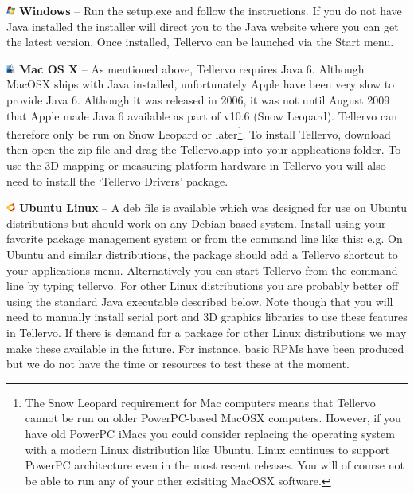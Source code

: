 \begin{description}
\item \includegraphics[width=3mm]{Images/windows.png} \textbf{Windows} -- Run the setup.exe and follow the instructions. If you do not have Java installed the installer will direct you to the Java website where you can get the latest version. Once installed, Tellervo can be launched via the Start menu.

\item \includegraphics[width=3mm]{Images/mac.png} \textbf{Mac OS X} -- As mentioned above, Tellervo requires Java 6. Although MacOSX ships with Java installed, unfortunately Apple have been very slow to provide Java 6. Although it was released in 2006, it was not until August 2009 that Apple made Java 6 available as part of v10.6 (Snow Leopard). Tellervo can therefore only be run on Snow Leopard or later\footnote{The Snow Leopard requirement for Mac computers means that Tellervo cannot be run on older PowerPC-based MacOSX computers.  However, if you have old PowerPC iMacs you could consider replacing the operating system with a modern Linux distribution like Ubuntu.  Linux continues to support PowerPC architecture even in the most recent releases.  You will of course not be able to run any of your other exisiting MacOSX software.}. To install Tellervo, download then open the zip file and drag the Tellervo.app into your applications folder.  To use the 3D mapping or measuring platform hardware in Tellervo you will also need to install the `Tellervo Drivers' package.  

\item \includegraphics[width=3mm]{Images/ubuntu.png} \textbf{Ubuntu Linux} --  A deb file is available which was designed for use on Ubuntu distributions but should work on any Debian based system. Install using your favorite package management system or from the command line like this: e.g.  On Ubuntu and similar distributions, the package should add a Tellervo shortcut to your applications menu. Alternatively you can start Tellervo from the command line by typing tellervo.  For other Linux distributions you are probably better off using the standard Java executable described below.  Note though that you will need to manually install serial port and 3D graphics libraries to use these features in Tellervo.  If there is demand for a package for other Linux distributions we may make these available in the future.  For instance, basic RPMs have been produced but we do not have the time or resources to test these at the moment.


\end{description}
